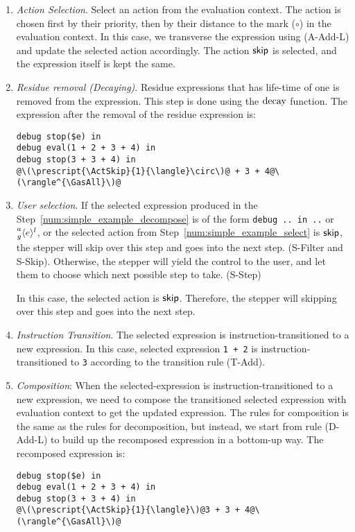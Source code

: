 \begin{enumerate}
\item \emph{Action Selection}. \label{num:simple_example_select}
  Select an action from the evaluation context. The action is chosen
  first by their priority, then by their distance to the mark
  (\(\circ\)) in the evaluation context. In this case, we transverse
  the expression using (A-Add-L) and update the selected action
  accordingly. The action \(\ActSkip\) is selected, and the expression
  itself is kept the same.

\item \emph{Residue removal (Decaying)}. Residue expressions that
  has life-time of one is removed from the expression. This step is
  done using the \(\Decay\) function. The expression after the removal
  of the residue expression is:
  \begin{lstlisting}[language=hazel,caption={Evaluation context after decaying},label={lst:simple_example_decay}]
debug stop($e) in
debug eval(1 + 2 + 3 + 4) in
debug stop(3 + 3 + 4) in
@\(\prescript{\ActSkip}{1}{\langle}\circ\)@ + 3 + 4@\(\rangle^{\GasAll}\)@\end{lstlisting}

\item \emph{User selection}. If the selected expression produced in
  the Step~\ref{num:simple_example_decompose} is of the form
  \lstinline[language=hazel]{debug .. in ..} or
  \(\Residue{a}{g}{l}{e}\), or the selected action from
  Step~\ref{num:simple_example_select} is \(\ActSkip\), the stepper
  will skip over this step and goes into the next step. (S-Filter and
  S-Skip). Otherwise, the stepper will yield the control to the user,
  and let them to choose which next possible step to take. (S-Step)

  In this case, the selected action is \(\ActSkip\). Therefore, the stepper
  will skipping over this step and goes into the next step.

\item \emph{Instruction Transition}. The selected expression is
  instruction-transitioned to a new expression. In this case, selected
  expression \lstinline[language=hazel]{1 + 2} is
  instruction-transitioned to \lstinline[language=hazel]{3} according
  to the transition rule (T-Add).

\item \emph{Composition}: When the selected-expression is
  instruction-transitioned to a new expression, we need to compose the
  transitioned selected expression with evaluation context to get the
  updated expression. The rules for composition is the same as the
  rules for decomposition, but instead, we start from rule (D-Add-L)
  to build up the recomposed expression in a bottom-up way. The
  recomposed expression is:
  \begin{lstlisting}[language=hazel]
debug stop($e) in
debug eval(1 + 2 + 3 + 4) in
debug stop(3 + 3 + 4) in
@\(\prescript{\ActSkip}{1}{\langle}\)@3 + 3 + 4@\(\rangle^{\GasAll}\)@\end{lstlisting}


\end{enumerate}
